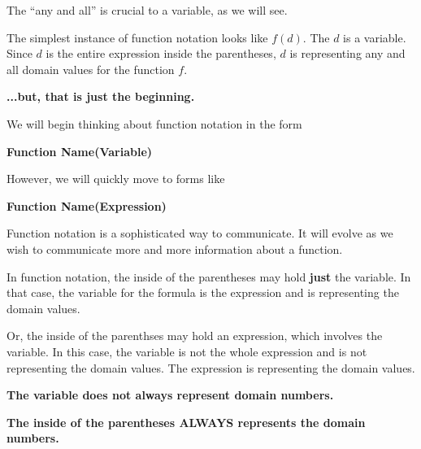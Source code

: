 \documentclass{ximera}
\begin{document}
The ``any and all'' is crucial to a variable, as we will see. 


The simplest instance of function notation looks like $f(d)$.  The $d$ is a variable.  Since $d$ is the entire expression inside the parentheses, $d$ is representing any and all domain values for the function $f$.



\textbf{\textcolor{red!70!black}{...but, that is just the beginning.}} 









We will begin thinking about function notation in the form 

\begin{center}

\textbf{\textcolor{blue!55!black}{Function Name(Variable)}}

\end{center}


However, we will quickly move to forms like


\begin{center}

\textbf{\textcolor{blue!55!black}{Function Name(Expression)}}

\end{center}




Function notation is a sophisticated way to communicate.  It will evolve as we wish to communicate more and more information about a function. 

In function notation, the inside of the parentheses may hold \textbf{just} the variable.  In that case, the variable for the formula is the expression and is representing the domain values. 

Or, the inside of the parenthses may hold an expression, which involves the variable.  In this case, the variable is not the whole expression and is not representing the domain values. The expression is representing the domain values.


 
\begin{center}

\textbf{\textcolor{blue!55!black}{The variable does not always represent domain numbers.}} 

\textbf{\textcolor{purple!85!blue}{The inside of the parentheses ALWAYS represents the domain numbers.}}


\end{center}
\end{document}

